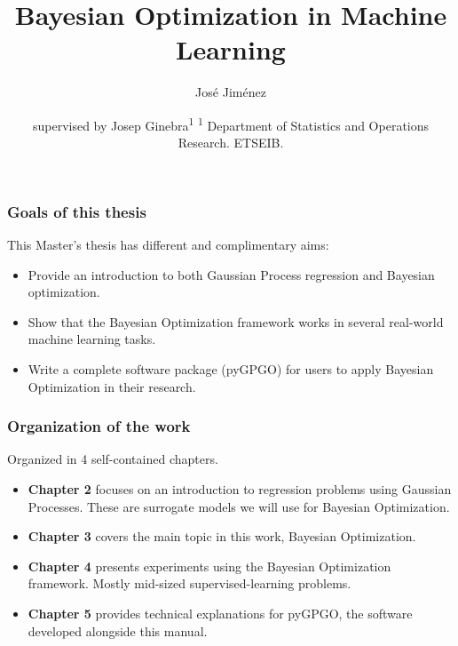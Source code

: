 \documentclass[10pt]{beamer}
\author{José Jiménez}
\title{Bayesian Optimization in Machine Learning}
\institute{Master's Thesis \vfill Master's degree in Statistics and Operations Research}
\date{\tiny supervised by Josep Ginebra\textsuperscript{1}\vfill
	\textsuperscript{1} Department of Statistics and Operations Research. ETSEIB.}
\begin{document}
	\maketitle
	
	\begin{frame}
		\frametitle{Goals of this thesis}
		This Master's thesis has different and complimentary aims:
		
		\begin{itemize}
			\item Provide an introduction to both Gaussian Process regression and Bayesian optimization. 
			\item Show that the Bayesian Optimization framework works in several real-world machine learning tasks.
			\item Write a complete software package (pyGPGO) for users to apply Bayesian Optimization in their research.
		\end{itemize}
	\end{frame}
	
	\begin{frame}
		\frametitle{Organization of the work}
		Organized in 4 self-contained chapters.
		\begin{itemize}
			\item \textbf{Chapter 2} focuses on an introduction to regression problems using Gaussian Processes. These are surrogate models we will use for Bayesian Optimization.
			\item \textbf{Chapter 3} covers the main topic in this work, Bayesian Optimization.
			\item \textbf{Chapter 4} presents experiments using the Bayesian Optimization framework. Mostly mid-sized supervised-learning problems.
			\item \textbf{Chapter 5} provides technical explanations for pyGPGO, the software developed alongside this manual.
		\end{itemize}
	\end{frame}
	
\end{document}
